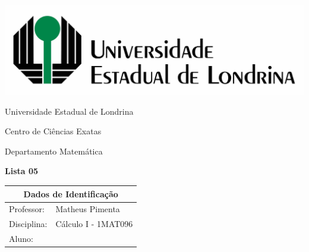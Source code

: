 \documentclass[oneside,a4paper,12pt]{article}
\newcommand{\universidade}{Universidade Estadual de Londrina}
\newcommand{\centro}{Centro de Ciências Exatas}
\newcommand{\departamento}{Departamento Matemática}
\newcommand{\curso}{Física}
\newcommand{\professores}{Matheus Pimenta}
\newcommand{\disciplina}{Cálculo I - 1MAT096}
\begin{document}
	\pagestyle{empty}
	
	\begin{center}
		\includegraphics[width=\linewidth/2]{logo.jpg}%
	 	\vspace{2pt} 	
		
		\universidade
		\par
		\centro
		\par
		\departamento
		\par
		\par
		\vspace{12pt}
		\LARGE \textbf{Lista 05}
		
	\end{center}
	
	\vspace{12pt}
	
	\begin{tabular}{ |l|p{12cm}| }
		
		\hline
		\multicolumn{2}{|c|}{\textbf{Dados de Identificação}} \\
		\hline
		Professor:         &    \professores           \\
		\hline
		Disciplina:        &    \disciplina          \\
		\hline
		Aluno:             &                   \\
		\hline
		
	\end{tabular}
	\vspace{6pt}
	
	
	\begin{snugshade}
	\end{snugshade}
\end{document}
